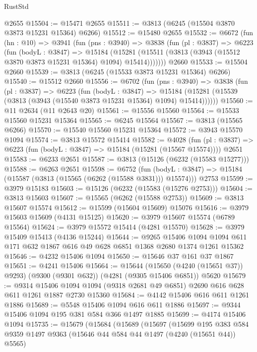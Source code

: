 \begin{lexlean}{RustStd}
\begin{coremodule}
    @2655
@15504 := @15471 @2655
@15511 := @3813 (@6245 (@15504 @3870 @3873 @15231 @15364) @6266)
@15512 := @15480 @2655
@15532 := @6672
    (fun (hn : @10) =>
    @3941
      (fun (pns : @3940) =>
      @3838
        (fun (pl : @3837) =>
        @6223
          (fun (bodyL : @3847) =>
          @15184
            (@15281 (@15511 (@3813 (@3943 (@15512 @3870 @3873 @15231 @15364) @1094) @15414)))))))
    @2660
@15533 := @15504 @2660
@15539 := @3813 (@6245 (@15533 @3873 @15231 @15364) @6266)
@15540 := @15512 @2660
@15556 := @6702
    (fun (pns : @3940) =>
    @3838
      (fun (pl : @3837) =>
      @6223
        (fun (bodyL : @3847) =>
        @15184 (@15281 (@15539 (@3813 (@3943 (@15540 @3873 @15231 @15364) @1094) @15414))))))
@15560 := @11 @2634 (@11 @2643 @20)
@15561 := @15556 @15560
@15564 := @15533 @15560 @15231 @15364
@15565 := @6245 @15564
@15567 := @3813 (@15565 @6266)
@15570 := @15540 @15560 @15231 @15364
@15572 := @3943 @15570 @1094
@15574 := @3813 @15572 @15414
@15582 := @4028
    (fun (pl : @3837) => @6223 (fun (bodyL : @3847) => @15184 (@15281 (@15567 @15574))))
    @2651
@15583 := @6233 @2651
@15587 := @3813 (@15126 (@6232 (@15583 @15277)))
@15588 := @6263 @2651
@15598 := @6752
    (fun (bodyL : @3847) => @15184 (@15587 (@3813 (@15565 (@6262 (@15588 @3831))) @15574)))
    @2753
@15599 := @3979 @15183
@15603 := @15126 (@6232 (@15583 (@15276 @2753)))
@15604 := @3813 @15603
@15607 := @15565 (@6262 (@15588 @2753))
@15609 := @3813 @15607 @15574
@15612 := @15599 (@15604 @15609) @15076
@15616 := @3979 @15603 @15609 (@4131 @15125)
@15620 := @3979 @15607 @15574 (@6789 @15564)
@15624 := @3979 @15572 @15414 (@4281 @15570)
@15628 := @3979 @15409 @15413 (@4136 @15244)
@15644 := @9265
    @15406
    @1094
    @1094
    @611
    @171
    @632
    @1867
    @616
    @49
    @628
    @6851
    @1368
    @2680
    @1374
    @1261
    @15362
@15646 := @4232 @15406 @1094
@15650 := @15646 @37 @161 @37 @1867
@15651 := @4241 @15406
@15664 := @15644
    (@15650 (@4240 (@15651 @37)) @9293)
    (@9300 (@9301 @632))
    (@4281 (@9305 @15406 @6851))
    @5620
@15679 := @9314
    @15406
    @1094
    @1094
    (@9318 @2681 @49 @6851)
    @2690
    @616
    @628
    @611
    @1261
    @1887
    @2730
    @15360
@15684 := @4142 @15406 @616 @611 @1261 @1886
@15689 := @5548 @15406 @1094 @616 @611 @1886
@15697 := @9344 @15406 @1094 @195 @381 @584 @366 @1497 @1885
@15699 := @4174 @15406 @1094
@15735 := @15679
    (@15684
      (@15689
        (@15697
          (@15699
            @195
            @383
            @584
            @9359
            @1497
            @9363
            (@15646 @44 @584 @44 @1497 (@4240 (@15651 @44)) @5565)

\end{coremodule}
\end{lexlean}
